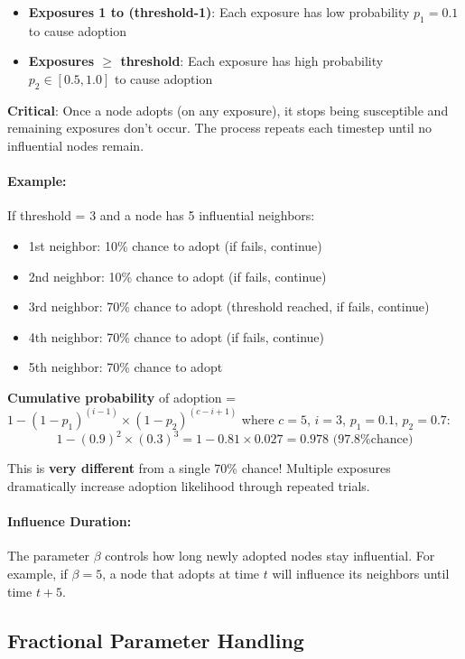 \documentclass[12pt,a4paper]{article}
\begin{document}
\begin{itemize}
    \item \textbf{Exposures 1 to (threshold-1)}: Each exposure has low probability $p_1 = 0.1$ to cause adoption
    \item \textbf{Exposures $\geq$ threshold}: Each exposure has high probability $p_2 \in [0.5, 1.0]$ to cause adoption
\end{itemize}

\textbf{Critical}: Once a node adopts (on any exposure), it stops being susceptible and remaining exposures don't occur. The process repeats each timestep until no influential nodes remain.

\paragraph{Example:} If threshold = 3 and a node has 5 influential neighbors:
\begin{itemize}
    \item 1st neighbor: 10\% chance to adopt (if fails, continue)
    \item 2nd neighbor: 10\% chance to adopt (if fails, continue)
    \item 3rd neighbor: 70\% chance to adopt (threshold reached, if fails, continue)
    \item 4th neighbor: 70\% chance to adopt (if fails, continue)
    \item 5th neighbor: 70\% chance to adopt
\end{itemize}

\textbf{Cumulative probability} of adoption = $1 - (1-p_1)^{(i-1)} \times (1-p_2)^{(c-i+1)}$ where $c=5$, $i=3$, $p_1=0.1$, $p_2=0.7$:
\begin{equation*}
1 - (0.9)^2 \times (0.3)^3 = 1 - 0.81 \times 0.027 = 0.978 \text{ (97.8\% chance)}
\end{equation*}

This is \textbf{very different} from a single 70\% chance! Multiple exposures dramatically increase adoption likelihood through repeated trials.

\paragraph{Influence Duration:}
The parameter $\beta$ controls how long newly adopted nodes stay influential. For example, if $\beta=5$, a node that adopts at time $t$ will influence its neighbors until time $t+5$.

\subsection{Fractional Parameter Handling}
\end{document}
